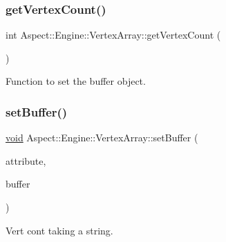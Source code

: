 \subsubsection{\texorpdfstring{get\+Vertex\+Count()}{getVertexCount()}}
{\footnotesize\ttfamily int Aspect\+::\+Engine\+::\+Vertex\+Array\+::get\+Vertex\+Count (\begin{DoxyParamCaption}{ }\end{DoxyParamCaption})}



Function to set the buffer object. 

\mbox{\label{class_aspect_1_1_engine_1_1_vertex_array_a0d986459ab43f774a9201667ff49672f}} 
\subsubsection{\texorpdfstring{set\+Buffer()}{setBuffer()}}
{\footnotesize\ttfamily \mbox{\hyperlink{_s_d_l__opengles2__gl2ext_8h_ae5d8fa23ad07c48bb609509eae494c95}{void}} Aspect\+::\+Engine\+::\+Vertex\+Array\+::set\+Buffer (\begin{DoxyParamCaption}\item[{\mbox{\hyperlink{_s_d_l__opengl__glext_8h_ae84541b4f3d8e1ea24ec0f466a8c568b}{std\+::string}}}]{attribute,  }\item[{\mbox{\hyperlink{class_aspect_1_1_engine_1_1_vertex_buffer}{Vertex\+Buffer}} $\ast$}]{buffer }\end{DoxyParamCaption})}



Vert cont taking a string. 

\mbox{\label{class_aspect_1_1_engine_1_1_vertex_array_a25294fe466043546f03876f169fd8740}} 
